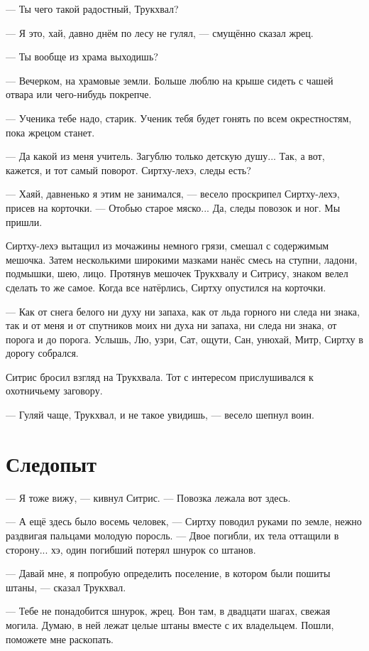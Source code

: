 --- Ты чего такой радостный, Трукхвал?

--- Я это, хай, давно днём по лесу не гулял, --- смущённо сказал жрец.

--- Ты вообще из храма выходишь?

--- Вечерком, на храмовые земли.
Больше люблю на крыше сидеть с чашей отвара или чего-нибудь покрепче.

--- Ученика тебе надо, старик.
Ученик тебя будет гонять по всем окрестностям, пока жрецом станет.

--- Да какой из меня учитель.
Загублю только детскую душу...
Так, а вот, кажется, и тот самый поворот.
Сиртху-лехэ, следы есть?

--- Хаяй, давненько я этим не занимался, --- весело проскрипел Сиртху-лехэ, присев на корточки.
--- Отобью старое мяско...
Да, следы повозок и ног.
Мы пришли.

Сиртху-лехэ вытащил из мочажины немного грязи, смешал с содержимым мешочка.
Затем несколькими широкими мазками нанёс смесь на ступни, ладони, подмышки, шею, лицо.
Протянув мешочек Трукхвалу и Ситрису, знаком велел сделать то же самое.
Когда все натёрлись, Сиртху опустился на корточки.

--- Как от снега белого ни духу ни запаха, как от льда горного ни следа ни знака, так и от меня и от спутников моих ни духа ни запаха, ни следа ни знака, от порога и до порога.
Услышь, Лю, узри, Сат, ощути, Сан, унюхай, Митр, Сиртху в дорогу собрался.

Ситрис бросил взгляд на Трукхвала.
Тот с интересом прислушивался к охотничьему заговору.

--- Гуляй чаще, Трукхвал, и не такое увидишь, --- весело шепнул воин.

\section{Следопыт}

--- Я тоже вижу, --- кивнул Ситрис.
--- Повозка лежала вот здесь.

--- А ещё здесь было восемь человек, --- Сиртху поводил руками по земле, нежно раздвигая пальцами молодую поросль.
--- Двое погибли, их тела оттащили в сторону... хэ, один погибший потерял шнурок со штанов.

--- Давай мне, я попробую определить поселение, в котором были пошиты штаны, --- сказал Трукхвал.

--- Тебе не понадобится шнурок, жрец.
Вон там, в двадцати шагах, свежая могила.
Думаю, в ней лежат целые штаны вместе с их владельцем.
Пошли, поможете мне раскопать.

